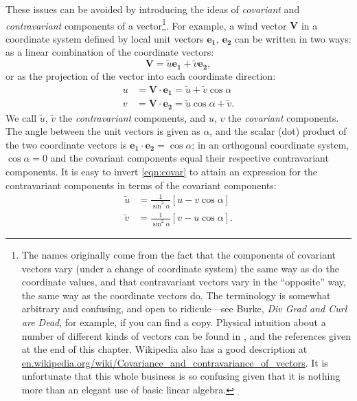 \documentclass[10pt,letterpaper,margin=1in]{memoir}
\begin{document}
These issues can be avoided by introducing the ideas of \textit{covariant} and \textit{contravariant} components of a vector\footnote{The names originally come from the fact that the components of covariant vectors vary (under a change of coordinate system) the same way as do the coordinate values, and that contravariant vectors vary in the ``opposite'' way, the same way as the coordinate vectors do. The terminology is somewhat arbitrary and confusing, and open to ridicule---see Burke, \textit{Div Grad and Curl are Dead}, for example, if you can find a copy. Physical intuition about a number of different kinds of vectors can be found in \citet{Weinreich1998},
  and the references given at the end of this chapter. Wikipedia also has a good description at \href{{https://en.wikipedia.org/wiki/Covariance_and_contravariance_of_vectors}}{{en.wikipedia.org/wiki/Covariance_and_contravariance_of_vectors}}. It is unfortunate that this whole business is so confusing given that it is nothing more than an elegant use of basic linear algebra.}. 
For example, a wind vector $\mathbf{V}$ in a coordinate system defined by local unit vectors $\mathbf{e_1}$, $\mathbf{e_2}$ can be written in two ways: as a linear combination of the coordinate vectors:
\begin{equation} \label{eqn:contra}
\mathbf{V} = \widetilde{u} \mathbf{e_1} + \widetilde{v} \mathbf{e_2},
\end{equation} 
or as the projection of the vector into each coordinate direction:
\begin{equation} \label{eqn:covar}
\begin{split} 
u &= \mathbf{V} \cdot \mathbf{e_1} = \widetilde{u} + \widetilde{v} \cos \alpha \\
v &= \mathbf{V} \cdot \mathbf{e_2} = \widetilde{u} \cos \alpha + \widetilde{v}.
\end{split}
\end{equation}
We call $\widetilde{u}$, $\widetilde{v}$ the \textit{contravariant} components, and $u$, $v$ the \textit{covariant} components. The angle between the unit vectors is given as $\alpha$, and the scalar (dot) product of the two coordinate vectors is $\mathbf{e_1} \cdot \mathbf{e_2} = \cos \alpha$; in an orthogonal coordinate system, $\cos \alpha = 0$ and the covariant components equal their respective contravariant components. It is easy to invert \eqref{eqn:covar} to attain an expression for the contravariant components in terms of the covariant components:
\begin{equation} \label{eqn:contrav}
\begin{split} 
 \widetilde{u} &= \frac{1}{\sin^2\alpha } \left [ u - v \cos \alpha \right ] \\
 \widetilde{v} &= \frac{1}{\sin^2\alpha } \left [ v - u\cos \alpha \right ].
\end{split}
\end{equation}
\end{document}
